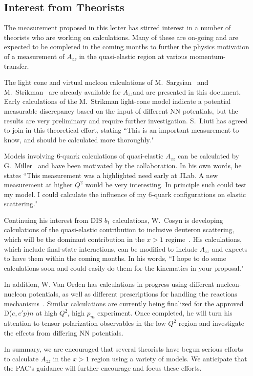 \subsection{Interest from Theorists}

The measurement proposed in this letter has stirred interest in a number of theorists who are working on calculations. Many of these are on-going and are expected to be completed in the coming months to further the physics motivation of a measurement of $A_{zz}$ in the quasi-elastic region at various momentum-transfer.

The light cone and virtual nucleon calculations of M.~Sargsian~\cite{misak-convo} and M.~Strikman~\cite{strikman-convo} are already available for $A_{zz}$and are presented in this document. Early calculations of the M.~Strikman light-cone model indicate a potential measurable discrepancy based on the input of different NN potentials, but the results are very preliminary and require further investigation. S.~Liuti has agreed to join in this theoretical effort, stating ``This is an important measurement to know, and should be calculated more thoroughly."~\cite{liuti-convo}

Models involving 6-quark calculations of quasi-elastic $A_{zz}$ can be calculated by G.~Miller~\cite{miller-convo} and have been motivated by the collaboration. In his own words, he states ``This measurement was a highlighted need early at JLab. A new measurement at higher $Q^2$ would be very interesting. In principle such could test my model. I could calculate the influence of my 6-quark configurations on elastic scattering."

Continuing his interest from DIS $b_1$ calculations, W.~Cosyn is developing calculations of the quasi-elastic contribution to inclusive deuteron scattering, which will be the dominant contribution in the $x>1$ regime~\cite{cosyn-convo}. His calculations, which include final-state interactions, can be modified to include $A_{zz}$ and expects to have them within the coming months. In his words, ``I hope to do some 
calculations soon and could easily do them for the kinematics in your 
proposal."


In addition, W. Van Orden has calculations in progress using different nucleon-nucleon potentials, as well as different prescriptions for handling the reactions mechanisms~\cite{vanorden-convo}.  Similar calculations are currently being finalized for the approved
D($e,e'p)n$ at high $Q^2$, high $p_m$ experiment. Once completed, he will turn his attention to tensor polarization observables in the low $Q^2$ region and investigate the effects from differing NN potentials.

In summary, we are encouraged that several theorists have begun serious efforts to calculate $A_{zz}$ in the $x>1$ region using a variety of models. We anticipate that the PAC's guidance will further encourage and focus these efforts.